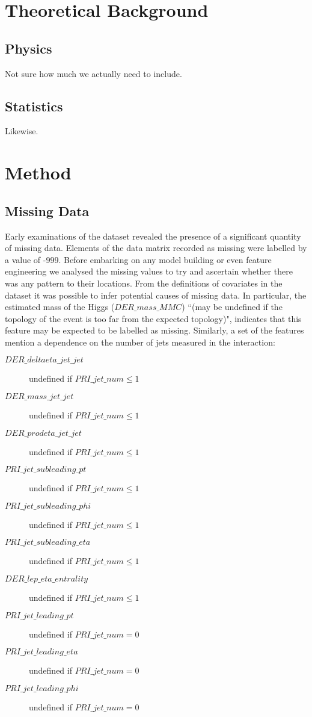 \section{Theoretical Background}
\subsection{Physics}
Not sure how much we actually need to include.

\subsection{Statistics}
Likewise.

\section{Method}

\subsection{Missing Data}
Early examinations of the dataset revealed the presence of a significant quantity of missing data. Elements of the data matrix recorded as missing were labelled by a value of -999. Before embarking on any model building or even feature engineering we analysed the missing values to try and ascertain whether there was any pattern to their locations. From the definitions of covariates in the dataset it was possible to infer potential causes of missing data. In particular, the estimated mass of the Higgs ($DER\_mass\_MMC$) ``(may be undefined if the topology of the event is too far from the expected topology)", indicates that this feature may be expected to be labelled as missing. Similarly, a set of the features mention a dependence on the number of jets measured in the interaction:

\begin{description}
    \item[$DER\_deltaeta\_jet\_jet$] undefined if $PRI\_jet\_num \leq 1$
    \item[$DER\_mass\_jet\_jet$] undefined if $PRI\_jet\_num \leq 1$
    \item[$DER\_prodeta\_jet\_jet$] undefined if $PRI\_jet\_num \leq 1$
    \item[$PRI\_jet\_subleading\_pt$] undefined if $PRI\_jet\_num \leq 1$
    \item[$PRI\_jet\_subleading\_phi$] undefined if $PRI\_jet\_num \leq 1$
    \item[$PRI\_jet\_subleading\_eta$] undefined if $PRI\_jet\_num \leq 1$
    \item[$DER\_lep\_eta\_entrality$] undefined if $PRI\_jet\_num \leq 1$
    \item[$PRI\_jet\_leading\_pt$] undefined if $PRI\_jet\_num = 0$
    \item[$PRI\_jet\_leading\_eta$] undefined if $PRI\_jet\_num = 0$
    \item[$PRI\_jet\_leading\_phi$] undefined if $PRI\_jet\_num = 0$   
\end{description}

